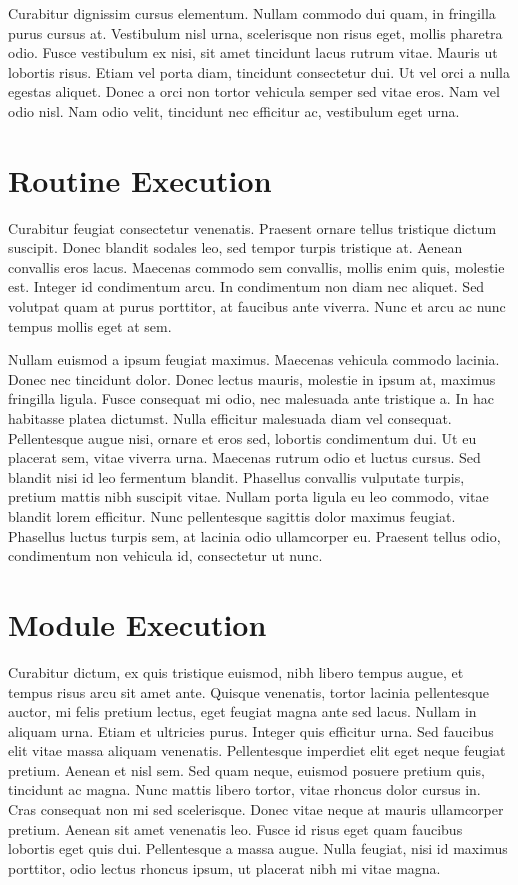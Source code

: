 Curabitur dignissim cursus elementum. Nullam commodo dui quam, in fringilla purus cursus at. Vestibulum nisl urna, scelerisque non risus eget, mollis pharetra odio. Fusce vestibulum ex nisi, sit amet tincidunt lacus rutrum vitae. Mauris ut lobortis risus. Etiam vel porta diam, tincidunt consectetur dui. Ut vel orci a nulla egestas aliquet. Donec a orci non tortor vehicula semper sed vitae eros. Nam vel odio nisl. Nam odio velit, tincidunt nec efficitur ac, vestibulum eget urna.


\section{Routine Execution}
Curabitur feugiat consectetur venenatis. Praesent ornare tellus tristique dictum suscipit. Donec blandit sodales leo, sed tempor turpis tristique at. Aenean convallis eros lacus. Maecenas commodo sem convallis, mollis enim quis, molestie est. Integer id condimentum arcu. In condimentum non diam nec aliquet. Sed volutpat quam at purus porttitor, at faucibus ante viverra. Nunc et arcu ac nunc tempus mollis eget at sem.

Nullam euismod a ipsum feugiat maximus. Maecenas vehicula commodo lacinia. Donec nec tincidunt dolor. Donec lectus mauris, molestie in ipsum at, maximus fringilla ligula. Fusce consequat mi odio, nec malesuada ante tristique a. In hac habitasse platea dictumst. Nulla efficitur malesuada diam vel consequat. Pellentesque augue nisi, ornare et eros sed, lobortis condimentum dui. Ut eu placerat sem, vitae viverra urna. Maecenas rutrum odio et luctus cursus. Sed blandit nisi id leo fermentum blandit. Phasellus convallis vulputate turpis, pretium mattis nibh suscipit vitae. Nullam porta ligula eu leo commodo, vitae blandit lorem efficitur. Nunc pellentesque sagittis dolor maximus feugiat. Phasellus luctus turpis sem, at lacinia odio ullamcorper eu. Praesent tellus odio, condimentum non vehicula id, consectetur ut nunc.


\section{Module Execution}
Curabitur dictum, ex quis tristique euismod, nibh libero tempus augue, et tempus risus arcu sit amet ante. Quisque venenatis, tortor lacinia pellentesque auctor, mi felis pretium lectus, eget feugiat magna ante sed lacus. Nullam in aliquam urna. Etiam et ultricies purus. Integer quis efficitur urna. Sed faucibus elit vitae massa aliquam venenatis. Pellentesque imperdiet elit eget neque feugiat pretium. Aenean et nisl sem. Sed quam neque, euismod posuere pretium quis, tincidunt ac magna. Nunc mattis libero tortor, vitae rhoncus dolor cursus in. Cras consequat non mi sed scelerisque. Donec vitae neque at mauris ullamcorper pretium. Aenean sit amet venenatis leo. Fusce id risus eget quam faucibus lobortis eget quis dui. Pellentesque a massa augue. Nulla feugiat, nisi id maximus porttitor, odio lectus rhoncus ipsum, ut placerat nibh mi vitae magna.
